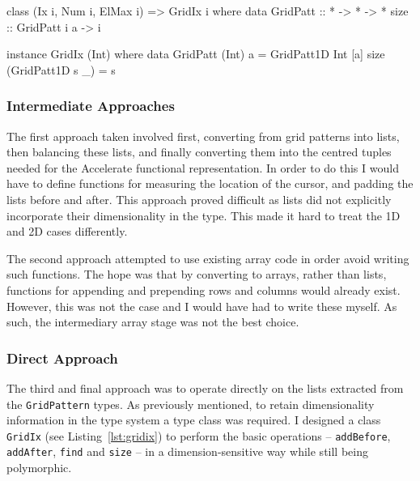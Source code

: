 \documentclass[12pt,a4paper,twoside]{scrbook}
\begin{document}
\begin{hflisting}[label=lst:assoctypefam, caption={The data family from
    listing~\ref{lst:datafam} has now been associated with the class
    \texttt{GridIx} to provide the function \texttt{size} for various
    dimensionalities.}]

class (Ix i, Num i, ElMax i) => GridIx i where
    data GridPatt :: * -> * -> *
    size :: GridPatt i a -> i

instance GridIx (Int) where
    data GridPatt (Int) a = GridPatt1D Int [a]
    size (GridPatt1D s _) = s

\end{hflisting}

\subsubsection{Intermediate Approaches}

The first approach taken involved first, converting from grid patterns into
lists, then balancing these lists, and finally converting them into the centred
tuples needed for the Accelerate functional representation. In order to do this
I would have to define functions for measuring the location of the cursor, and
padding the lists before and after. This approach proved difficult as lists did
not explicitly incorporate their dimensionality in the type. This made it hard
to treat the 1D and 2D cases differently.

The second approach attempted to use existing array code in order avoid writing
such functions. The hope was that by converting to arrays, rather than lists,
functions for appending and prepending rows and columns would already
exist. However, this was not the case and I would have had to write these
myself. As such, the intermediary array stage was not the best choice.

\subsubsection{Direct Approach}

The third and final approach was to operate directly on the lists extracted from
the \texttt{GridPattern} types. As previously mentioned, to retain
dimensionality information in the type system a type class was required.  I
designed a class \texttt{GridIx} (see Listing~\ref{lst:gridix}) to perform the
basic operations -- \texttt{addBefore}, \texttt{addAfter}, \texttt{find} and
\texttt{size} -- in a dimension-sensitive way while still being polymorphic.
\end{document}
